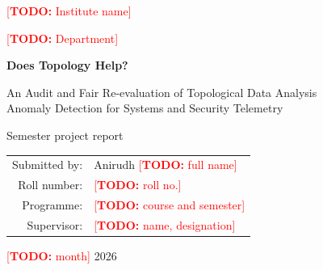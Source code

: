 \documentclass[11pt,a4paper]{article}
\newcommand{\fillin}[1]{\textcolor{red}{[\textbf{TODO:} #1]}}
\begin{document}
\begin{titlepage}
  \centering
  \vspace*{1.5cm}
  {\Large \fillin{Institute name}\par}
  \vspace{0.3cm}
  {\large \fillin{Department}\par}
  \vspace{2cm}
  {\LARGE\bfseries Does Topology Help?\par}
  \vspace{0.4cm}
  {\Large An Audit and Fair Re-evaluation of Topological Data Analysis\\
  Anomaly Detection for Systems and Security Telemetry\par}
  \vspace{2cm}
  {\large Semester project report\par}
  \vspace{1.5cm}
  \begin{tabular}{rl}
    Submitted by: & Anirudh \fillin{full name} \\
    Roll number:  & \fillin{roll no.} \\
    Programme:    & \fillin{course and semester} \\
    Supervisor:   & \fillin{name, designation} \\
  \end{tabular}
  \vfill
  {\large \fillin{month} 2026\par}
\end{titlepage}

\begin{abstract}
\noindent
Topological data analysis (TDA) is increasingly proposed for anomaly detection on network, host and server telemetry. The usual argument is that topology captures ``shape'' that simple statistics miss. We test whether the published evidence supports that argument, and then test the argument ourselves.
First, we audit 95 records, of which 32 are core applications, against a 13-item rigour rubric. Only 4 of the 32 papers compare topology fairly, by swapping it for cheap features under the same data, split and detector: two lose, one ties and one shows a weak win. None tests against an adversary.
Second, we read the released code of six projects at pinned commits. Three of them use test information when choosing thresholds, detectors or training stops. One assigns random timestamps that then serve as the persistence filtration. A topology processor shipped in Fluent Bit does not count what its comment says it counts.
Third, we re-evaluate the claims under a preregistered protocol on SMD and CTU-13. On SMD, adding topological features to the same detector raises PR-AUC by 0.054 [0.035, 0.076], at about 1.6\,ms per window. \fillin{E1, E2, E4 and E5 results; the shape-versus-volume answer}.
\end{abstract}
\end{document}
